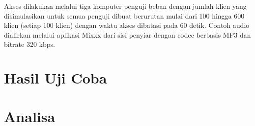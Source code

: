 Akses dilakukan melalui tiga komputer penguji beban dengan jumlah klien yang disimulasikan untuk semua penguji dibuat berurutan mulai dari 100 hingga 600 klien (setiap 100 klien) dengan waktu akses dibatasi pada 60 detik. Contoh audio dialirkan melalui aplikasi Mixxx dari sisi penyiar dengan codec berbasis MP3 dan bitrate 320 kbps.


\section{Hasil Uji Coba}

\section{Analisa}



